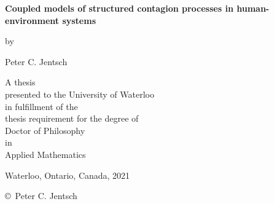 \pagestyle{empty}

\begin{titlepage}
        \begin{center}
        \vspace*{1.0cm}

        \Huge
        {\bf Coupled models of structured contagion processes in human-environment systems}

        \vspace*{1.0cm}

        \normalsize
        by \\

        \vspace*{1.0cm}

        \Large
        Peter C. Jentsch \\

        \vspace*{3.0cm}

        \normalsize
        A thesis \\
        presented to the University of Waterloo \\ 
        in fulfillment of the \\
        thesis requirement for the degree of \\
        Doctor of Philosophy \\
        in \\
        Applied Mathematics \\

        \vspace*{2.0cm}

        Waterloo, Ontario, Canada, 2021 \\

        \vspace*{1.0cm}

        \copyright\ Peter C. Jentsch \\
        \end{center}
\end{titlepage}

\pagestyle{plain}
\setcounter{page}{2}

